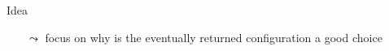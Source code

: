 \begin{frame}[c,fragile]{Idea}

\begin{center}
\scalebox{0.9}{
    \let\oldpause=\pause \def\pause{} 
	
	\let\pause=\oldpause
}
\end{center}

\begin{itemize}
	\item[$\leadsto$] focus on why is the eventually returned configuration a good choice
\end{itemize}

\end{frame}
